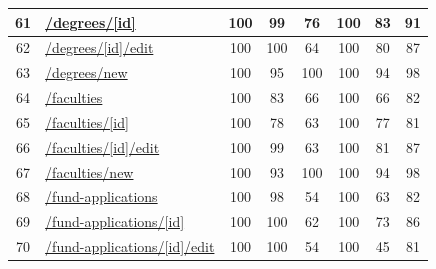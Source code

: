 \begin{longtable}{|c|p{5cm}|c|c|c|c|c|c|}
      \hline
      61                                       & \url{/degrees/[id]}                                        & 100              & 99               & 76               & 100              & 83               & 91            \\
      \hline
      62                                       & \url{/degrees/[id]/edit}                                   & 100              & 100              & 64               & 100              & 80               & 87            \\
      \hline
      63                                       & \url{/degrees/new}                                         & 100              & 95               & 100              & 100              & 94               & 98            \\
      \hline
      64                                       & \url{/faculties}                                           & 100              & 83               & 66               & 100              & 66               & 82            \\
      \hline
      65                                       & \url{/faculties/[id]}                                      & 100              & 78               & 63               & 100              & 77               & 81            \\
      \hline
      66                                       & \url{/faculties/[id]/edit}                                 & 100              & 99               & 63               & 100              & 81               & 87            \\
      \hline
      67                                       & \url{/faculties/new}                                       & 100              & 93               & 100              & 100              & 94               & 98            \\
      \hline
      68                                       & \url{/fund-applications}                                   & 100              & 98               & 54               & 100              & 63               & 82            \\
      \hline
      69                                       & \url{/fund-applications/[id]}                              & 100              & 100              & 62               & 100              & 73               & 86            \\
      \hline
      70                                       & \url{/fund-applications/[id]/edit}                         & 100              & 100              & 54               & 100              & 45               & 81            \\

\end{longtable}
